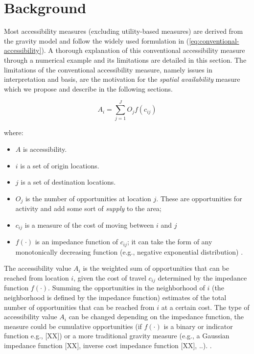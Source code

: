 \documentclass[]{elsarticle} %
\providecommand{\tightlist}{%
  \setlength{\itemsep}{0pt}\setlength{\parskip}{0pt}}
\begin{document}
\hypertarget{background}{%
\section{Background}\label{background}}

Most accessibility measures (excluding utility-based measures) are
derived from the gravity model and follow the widely used formulation in
(\ref{eq:conventional-accessibility}). A thorough explanation of this
conventional accessibility measure through a numerical example and its
limitations are detailed in this section. The limitations of the
conventional accessibility measure, namely issues in interpretation and
basis, are the motivation for the \emph{spatial availability} measure
which we propose and describe in the following sections.

\begin{equation}
\label{eq:conventional-accessibility}
A_i = \sum_{j=1}^JO_jf(c_{ij})
\end{equation}

\noindent where:

\begin{itemize}
\tightlist
\item
  \(A\) is accessibility.
\item
  \(i\) is a set of origin locations.
\item
  \(j\) is a set of destination locations.
\item
  \(O_j\) is the number of opportunities at location \(j\). These are
  opportunities for activity and add some sort of \emph{supply} to the
  area;
\item
  \(c_{ij}\) is a measure of the cost of moving between \(i\) and \(j\)
\item
  \(f(\cdot)\) is an impedance function of \(c_{ij}\); it can take the
  form of any monotonically decreasing function (e.g., negative
  exponential distribution) .
\end{itemize}

The accessibility value \(A_i\) is the weighted sum of opportunities
that can be reached from location \(i\), given the cost of travel
\(c_{ij}\) determined by the impedance function \(f(\cdot)\). Summing
the opportunities in the neighborhood of \(i\) (the neighborhood is
defined by the impedance function) estimates of the total number of
opportunities that can be reached from \(i\) at a certain cost. The type
of accessibility value \(A_i\) can be changed depending on the impedance
function, the measure could be cumulative opportunities (if \(f(\cdot)\)
is a binary or indicator function e.g., {[}XX{]}) or a more traditional
gravity measure (e.g., a Gaussian impedance function {[}XX{]}, inverse
cost impedance function {[}XX{]}, ..). .
\end{document}
